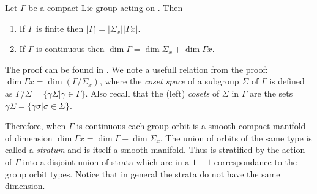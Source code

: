 \begin{proposition}
 Let $\Gamma$ be a compact Lie group acting on . Then
 \begin{enumerate}
  \item If $\Gamma$ is finite then $|\Gamma|=|\Sigma_x||\Gamma x|$.
  \item If $\Gamma$ is continuous then $\dim \Gamma = \dim \Sigma_x+\dim \Gamma x$.
 \end{enumerate}
\end{proposition}
The proof can be found in . We note a usefull relation from the proof: $\dim\Gamma x =\dim(\Gamma/\Sigma_x)$, where the \emph{coset space} of a subgroup $\Sigma$  of $\Gamma$ is defined as $\Gamma/\Sigma=\{\gamma\Sigma|\gamma\in\Gamma\}$. Also recall that the (left) \emph{cosets} of $\Sigma$ in $\Gamma$ are the sets $\gamma\Sigma=\{\gamma\sigma|\sigma\in\Sigma\}$.

Therefore, when $\Gamma$ is continuous each group orbit is a smooth compact manifold of dimension 
$\dim \Gamma x=\dim \Gamma-\dim \Sigma_x$. The union of orbits of the same type is called a \emph{stratum}
and is itself a smooth manifold. Thus  is stratified by the action of $\Gamma$ into
a disjoint union of strata which are in a $1-1$ correspondance to the group orbit types. Notice that in general
the strata do not have the same dimension. 






